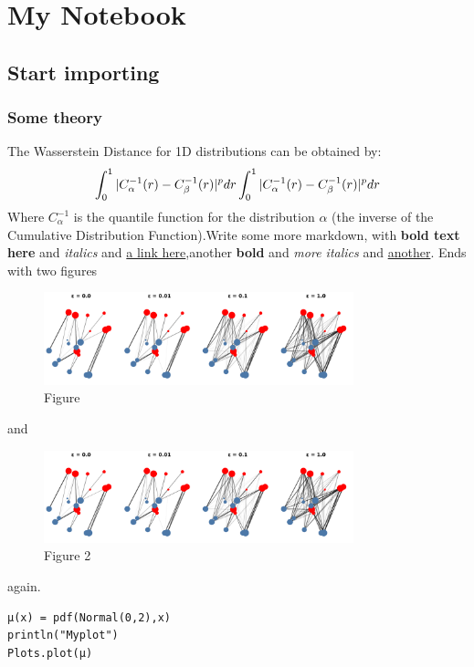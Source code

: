\newpage

\chapter{My Notebook}

\section{Start importing}

\subsection{Some theory}
The Wasserstein Distance for 1D distributions can be obtained by:
\begin{displaymath}
	\int_0^1 |C_\alpha^{-1}(r) - C_\beta^{-1}(r)|^p dr \\
	\int_0^1 |C_\alpha^{-1}(r) - C_\beta^{-1}(r)|^p dr
\end{displaymath}
Where $C_\alpha^{-1}$ is the quantile function for the distribution $\alpha$ (the inverse of the Cumulative Distribution Function).Write some more markdown, with \textbf{bold text here} and \textit{italics} and \href{https://juliaoptimaltransport.github.io/OptimalTransport.jl/stable/examples/basic/}{a link here},another \textbf{bold} and \textit{more italics} and \href{https://github.com/}{another}. Ends with two figures
\begin{figure}[H]
	 \centering
	\includegraphics[width=0.8\textwidth]{./figures/figure}
	\caption{Figure}
	\label{fig:figure}
\end{figure}
 and
\begin{figure}[H]
	 \centering
	\includegraphics[width=0.8\textwidth]{./figures/figure}
	\caption{Figure 2}
	\label{fig:figure}
\end{figure}
 again.
\begin{lstlisting}[language=JuliaLocal, style=julia]
μ(x) = pdf(Normal(0,2),x)
println("Myplot")
Plots.plot(μ)
\end{lstlisting}

